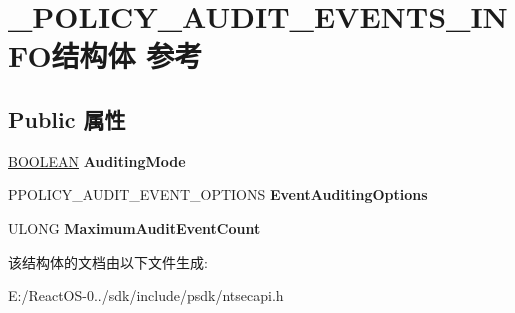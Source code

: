 \hypertarget{struct___p_o_l_i_c_y___a_u_d_i_t___e_v_e_n_t_s___i_n_f_o}{}\section{\+\_\+\+P\+O\+L\+I\+C\+Y\+\_\+\+A\+U\+D\+I\+T\+\_\+\+E\+V\+E\+N\+T\+S\+\_\+\+I\+N\+F\+O结构体 参考}
\label{struct___p_o_l_i_c_y___a_u_d_i_t___e_v_e_n_t_s___i_n_f_o}
\subsection*{Public 属性}
\begin{DoxyCompactItemize}
\item 
\mbox{\label{struct___p_o_l_i_c_y___a_u_d_i_t___e_v_e_n_t_s___i_n_f_o_a1a63eef7587636fdc610c0d29538b98f}} 
\hyperlink{_processor_bind_8h_a112e3146cb38b6ee95e64d85842e380a}{B\+O\+O\+L\+E\+AN} {\bfseries Auditing\+Mode}
\item 
\mbox{\label{struct___p_o_l_i_c_y___a_u_d_i_t___e_v_e_n_t_s___i_n_f_o_ad411f45a6a3b6470566823257a49fb71}} 
P\+P\+O\+L\+I\+C\+Y\+\_\+\+A\+U\+D\+I\+T\+\_\+\+E\+V\+E\+N\+T\+\_\+\+O\+P\+T\+I\+O\+NS {\bfseries Event\+Auditing\+Options}
\item 
\mbox{\label{struct___p_o_l_i_c_y___a_u_d_i_t___e_v_e_n_t_s___i_n_f_o_a38dcb117826d3d52befb672913faf484}} 
U\+L\+O\+NG {\bfseries Maximum\+Audit\+Event\+Count}
\end{DoxyCompactItemize}


该结构体的文档由以下文件生成\+:\begin{DoxyCompactItemize}
\item 
E\+:/\+React\+O\+S-\/0../sdk/include/psdk/ntsecapi.\+h\end{DoxyCompactItemize}
